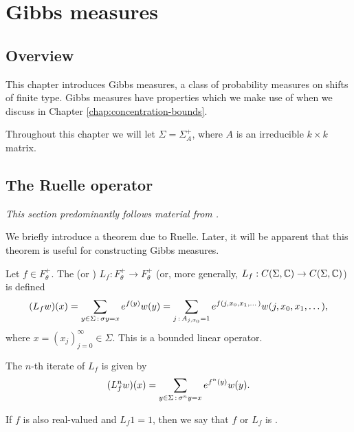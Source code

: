 \chapter{Gibbs measures} \label{chap:gibbs}
\section{Overview}
This chapter introduces Gibbs measures, a class of probability measures on shifts of finite type. Gibbs measures have properties which we make use of when we discuss \cite{chazottes-maldonado:cbfee} in Chapter \ref{chap:concentration-bounds}.

Throughout this chapter we will let $\Sigma = \Sigma_A^+$, where $A$ is an irreducible $k \times k$ matrix.

\section{The Ruelle operator}
\emph{This section predominantly follows material from \cite[Chapter 2]{parry-pollicott:zeta-fns-periodic-orbits}.}

We briefly introduce a theorem due to Ruelle. Later, it will be apparent that this theorem is useful for constructing Gibbs measures.

\begin{definition}
	Let $f \in F_\theta^+$. The  (or ) $L_f : F_\theta^+ \to F_\theta^+$ (or, more generally, $L_f : C(\Sigma, \mathbb{C}) \to C(\Sigma, \mathbb{C})$) is defined
	\[
	(L_f{w})(x) = \sum_{y \in \Sigma \,:\, \sigma{y} = x}{e^{f(y)} w(y)} = \sum_{j \,:\, A_{j, x_0} = 1}{e^{f(j, x_0, x_1, \dots)} w(j, x_0, x_1, \dots)},
	\]
	where $x = (x_j)_{j = 0}^\infty \in \Sigma$. This is a bounded linear operator.
	
	The $n$-th iterate of $L_f$ is given by
	\[
	(L_f^n{w})(x) = \sum_{y \in \Sigma \,:\, \sigma^n{y} = x}{e^{f^n(y)} w(y)}.
	\]
	
	If $f$ is also real-valued and $L_f{1} = 1$, then we say that $f$ or $L_f$ is .
\end{definition}


